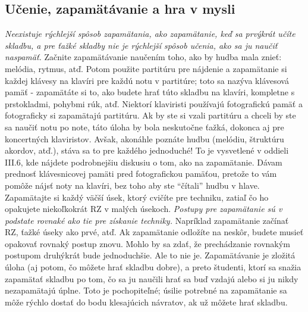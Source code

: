 \subsection{Učenie, zapamätávanie a hra v mysli}
\emph{Neexistuje rýchlejší spôsob zapamätania, ako zapamätanie, keď sa prvýkrát učíte skladbu, a pre ťažké skladby nie je rýchlejší spôsob učenia, ako sa ju naučiť naspamäť.} Začnite zapamätávanie naučením toho, ako by hudba mala znieť: melódia, rytmus, atď. Potom použite partitúru pre nájdenie a zapamätanie si každej klávesy na klavíri pre každú notu v partitúre; toto sa nazýva klávesová pamäť - zapamätáte si to, ako budete hrať túto skladbu na klavíri, kompletne s prstokladmi, pohybmi rúk, atď. Niektorí klaviristi používajú fotografickú pamäť a fotograficky si zapamätajú partitúru. Ak by ste si vzali partitúru a chceli by ste sa naučiť notu po note, táto úloha by bola neskutočne ťažká, dokonca aj pre koncertných klaviristov. Avšak, akonáhle poznáte hudbu (melódiu, štruktúru akordov, atď.), stáva sa to pre každého jednoduché! To je vysvetlené v oddieli III.6, kde nájdete podrobnejšiu diskusiu o tom, ako na zapamätanie. Dávam prednosť klávesnicovej pamäti pred fotografickou pamäťou, pretože to vám pomôže nájsť noty na klavíri, bez toho aby ste “čítali” hudbu v hlave. Zapamätajte si každý väčší úsek, ktorý cvičíte pre techniku, zatiaľ čo ho opakujete niekoľkokrát RZ v malých úsekoch. \emph{Postupy pre zapamätanie sú v podstate rovnaké ako tie pre získanie techniky.} Napríklad zapamätanie začínať RZ, ťažké úseky ako prvé, atď. Ak zapamätanie odložíte na  neskôr, budete musieť opakovať rovnaký postup znovu. Mohlo by sa zdať, že prechádzanie rovnakým postupom druhýkrát bude jednoduchšie. Ale to nie je. Zapamätávanie je zložitá úloha (aj potom, čo môžete hrať skladbu dobre), a preto študenti, ktorí sa snažia zapamätať skladbu po tom, čo sa ju naučili hrať sa buď vzdajú alebo si ju nikdy nezapamätajú úplne. Toto je pochopiteľné; úsilie potrebné na zapamätanie sa môže rýchlo dostať do bodu klesajúcich návratov, ak už môžete hrať skladbu.

